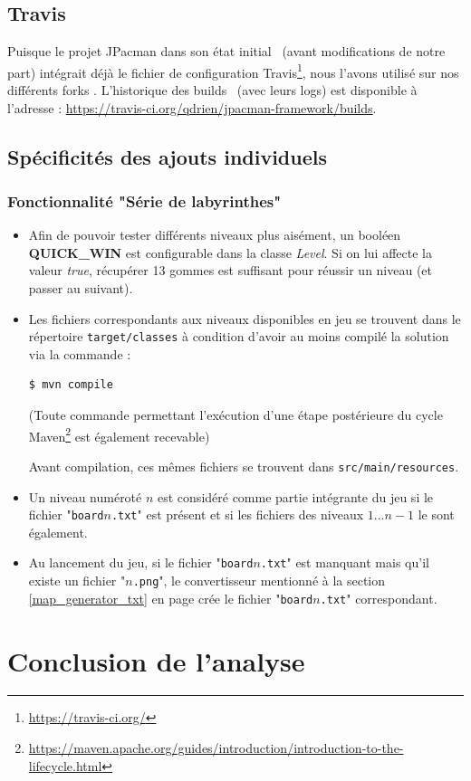 \documentclass[12pt, openany]{report}
\begin{document}
\subsection{Travis}
Puisque le projet JPacman dans son état \og initial \fg \, (avant modifications de notre part) intégrait déjà le fichier de configuration Travis\footnote{\url{https://travis-ci.org/}}, nous l'avons utilisé sur nos différents \og forks \fg .
L'historique des \og builds \fg \, (avec leurs logs) est disponible à l'adresse : \url{https://travis-ci.org/qdrien/jpacman-framework/builds}.




\subsection{Spécificités des ajouts individuels}
\subsubsection{Fonctionnalité "Série de labyrinthes"}
\begin{itemize}
	\item Afin de pouvoir tester différents niveaux plus aisément, un booléen \mbox{\textbf{QUICK\_WIN}} est configurable dans la classe \mbox{\textit{Level}}.
	Si on lui affecte la valeur \textit{true}, récupérer 13 gommes est suffisant pour réussir un niveau (et passer au suivant).
	\item Les fichiers correspondants aux niveaux disponibles en jeu se trouvent dans le répertoire \nolinkurl{target/classes} à condition d'avoir au moins \og compilé \fg la solution via la commande :
	\begin{lstlisting}[language=bash]
	$ mvn compile
	\end{lstlisting}
	(Toute commande permettant l'exécution d'une étape postérieure du cycle Maven\footnote{\url{https://maven.apache.org/guides/introduction/introduction-to-the-lifecycle.html}} est également recevable)
	
	Avant compilation, ces mêmes fichiers se trouvent dans \nolinkurl{src/main/resources}.
	\item Un niveau numéroté $n$ est considéré comme partie intégrante du jeu si le fichier "\nolinkurl{board}$n$\nolinkurl{.txt}" est présent et si les fichiers des niveaux $1...n-1$ le sont également.
	\item Au lancement du jeu, si le fichier "\nolinkurl{board}$n$\nolinkurl{.txt}" est manquant mais qu'il existe un fichier "$n$\nolinkurl{.png}", le convertisseur mentionné à la section \ref{map_generator_txt} en page \pageref{map_generator_txt} crée le fichier "\nolinkurl{board}$n$\nolinkurl{.txt}" correspondant.
\end{itemize}

\section{Conclusion de l'analyse}





%
%
\end{document}
